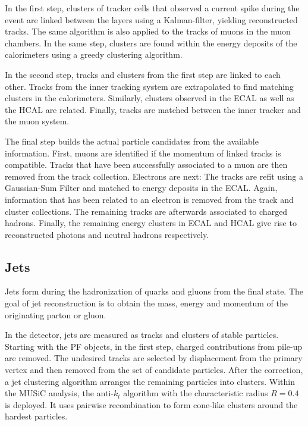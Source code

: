 In the first step, clusters of tracker cells that observed a current spike during the event are linked between the layers using a Kalman-filter, yielding reconstructed tracks. The same algorithm is also applied to the tracks of muons in the muon chambers. In the same step, clusters are found within the energy deposits of the calorimeters using a greedy clustering algorithm.

In the second step, tracks and clusters from the first step are linked to each other. Tracks from the inner tracking system are extrapolated to find matching clusters in the calorimeters. 
Similarly, clusters observed in the \ac{ECAL} as well as the \ac{HCAL} are related. Finally, tracks are matched between the inner tracker and the muon system.

The final step builds the actual particle candidates from the available information.
First, muons are identified if the momentum of linked tracks is compatible. Tracks that have been successfully associated to a muon are then removed from the track collection. Electrons are next: The tracks are refit using a Gaussian-Sum Filter and matched to energy deposits in the \ac{ECAL}. Again, information that has been related to an electron is removed from the track and cluster collections. The remaining tracks are afterwards associated to charged hadrons. Finally, the remaining energy clusters in \ac{ECAL} and \ac{HCAL} give rise to reconstructed photons and neutral hadrons respectively.

\subsection{Jets}
\label{sec:jets}

Jets form during the hadronization of quarks and gluons from the final state. The goal of jet reconstruction is to obtain the mass, energy and momentum of the originating parton or gluon.

In the detector, jets are measured as tracks and clusters of stable particles. Starting with the \ac{PF} objects, in the first step, charged contributions from pile-up are removed. The undesired tracks are selected by displacement from the primary vertex and then removed from the set of candidate particles.
After the correction, a jet clustering algorithm arranges the remaining particles into clusters. Within the \ac{MUSiC} analysis, the anti-$k_t$ algorithm\cite{Cacciari:antiktjet} with the characteristic radius $R = \num{0.4}$ is deployed. It uses pairwise recombination to form cone-like clusters around the hardest particles.

